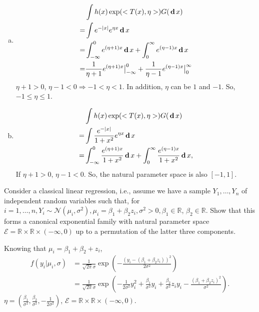 \begin{solution}
    \begin{enumerate}[(a)]
        \item \begin{align*}
            &\int h(x)\exp(<T(x), \eta>)G(\,\mathbf{d}\, x)\\
            =&{}\int e^{-|x|}e^{\eta x}\,\mathbf{d}\, x\\
            =&{}\int_{-\infty}^0 e^{(\eta+1) x}\,\mathbf{d}\, x+ \int_{0}^\infty e^{(\eta-1) x}\,\mathbf{d}\, x\\
            =&{}\frac{1}{\eta+1}e^{(\eta+1) x}\big|_{-\infty}^0+\frac{1}{\eta-1}e^{(\eta-1)x}\big|_0^{\infty}
        \end{align*}
        $\eta+1>0$, $\eta-1<0\Rightarrow -1<\eta<1$. In addition, $\eta$ can be $1$ and $-1$. So, $-1\leqslant\eta\leqslant1$. 
        \item \begin{align*}
            &\int h(x)\exp(<T(x), \eta>)G(\,\mathbf{d}\, x)\\
            =&{}\int \frac{e^{-|x|}}{1+x^2}e^{\eta x}\,\mathbf{d}\, x\\
            =&{}\int_{-\infty}^0 \frac{e^{(\eta+1) x}}{1+x^2}\,\mathbf{d}\, x+ \int_{0}^\infty \frac{e^{(\eta-1) x}}{1+x^2}\,\mathbf{d}\, x, 
        \end{align*}
        If $\eta+1>0$, $\eta-1<0$. So, the natural parameter space is also $[-1,1]$. 
    \end{enumerate}
\end{solution}


\begin{exercise}
    Consider a classical linear regression, i.e., assume we have a sample \(Y_{1}, \ldots, Y_{n}\) of independent random variables such that, for \(i=1, \ldots, n, Y_{i} \sim \mathcal{N}\left(\mu_{i}, \sigma^{2}\right), \mu_{i}=\beta_{1}+\beta_{2} z_{i}, \sigma^{2}>0, \beta_{1} \in \mathbb{R}\), \(\beta_{2} \in \mathbb{R}\). Show that this forms a canonical exponential family with natural parameter space \(\mathcal{E}=\mathbb{R} \times \mathbb{R} \times(-\infty, 0)\) up to a permutation of the latter three components.
\end{exercise}

\begin{solution}
    Knowing that $\mu_i=\beta_1+\beta_2+z_i$, 
    \begin{align*}
        f(y_i|\mu_i,\sigma)&=\frac{1}{\sqrt{2\pi}\sigma}\exp\left(-\frac{(y_i-(\beta_1+\beta_2z_i))^2}{2\sigma^2}\right)\\
        &=\frac{1}{\sqrt{2\pi}\sigma}\exp\left(-\frac{1}{2\sigma^2}y_i^2+\frac{\beta_1}{\sigma^2}y_i+\frac{\beta_2}{\sigma^2}z_iy_i-\frac{(\beta_1+\beta_2z_i)^2}{\sigma^2}\right). 
    \end{align*}
    $\eta=(\frac{\beta_1}{\sigma^2}, \frac{\beta_2}{\sigma^2}, -\frac{1}{2\sigma^2})$, $\mathcal{E}=\mathbb{R}\times\mathbb{R}\times(-\infty,0)$. 
\end{solution}
